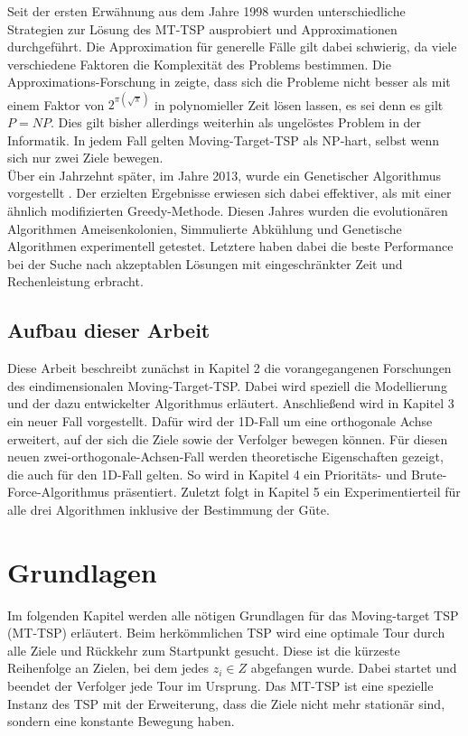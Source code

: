 \documentclass[german,version-2019-11]{uzl-thesis}
\begin{document}
Seit der ersten Erwähnung aus dem Jahre 1998 wurden unterschiedliche Strategien zur Lösung des MT-TSP ausprobiert und Approximationen durchgeführt. Die Approximation für generelle Fälle gilt dabei schwierig, da viele verschiedene Faktoren die Komplexität des Problems bestimmen. Die Approximations-Forschung in \cite{hammar} zeigte, dass sich die Probleme nicht besser als mit einem Faktor von $2^{\pi(\sqrt{\pi})}$ in polynomieller Zeit lösen lassen, es sei denn es gilt $P=NP$. Dies gilt bisher allerdings weiterhin als ungelöstes Problem in der Informatik. In jedem Fall gelten Moving-Target-TSP als NP-hart, selbst wenn sich nur zwei Ziele bewegen\cite{hammar}.\\
Über ein Jahrzehnt später, im Jahre 2013, wurde ein Genetischer Algorithmus vorgestellt
\cite{choubey2013moving}. Der erzielten Ergebnisse erwiesen sich dabei effektiver, als mit einer ähnlich modifizierten Greedy-Methode. Diesen Jahres wurden die evolutionären Algorithmen\cite{weicker2015evolutionare} Ameisenkolonien, Simmulierte Abkühlung und Genetische Algorithmen experimentell getestet\cite{moraes}. Letztere haben dabei die beste Performance bei der Suche nach akzeptablen Lösungen mit eingeschränkter Zeit und Rechenleistung erbracht.

\section{Aufbau dieser Arbeit}
Diese Arbeit beschreibt zunächst in Kapitel 2 die vorangegangenen Forschungen des eindimensionalen Moving-Target-TSP. Dabei wird speziell die Modellierung und der dazu entwickelter Algorithmus erläutert. Anschließend wird in Kapitel 3 ein neuer Fall vorgestellt. Dafür wird der 1D-Fall um eine orthogonale Achse erweitert, auf der sich die Ziele sowie der Verfolger bewegen können. Für diesen neuen zwei-orthogonale-Achsen-Fall werden theoretische Eigenschaften gezeigt, die auch für den 1D-Fall gelten. So wird in Kapitel 4 ein Prioritäts- und Brute-Force-Algorithmus präsentiert. Zuletzt folgt in Kapitel 5 ein Experimentierteil für alle drei Algorithmen inklusive der Bestimmung der Güte.


\chapter{Grundlagen}
\label{chapter-use}
Im folgenden Kapitel werden alle nötigen Grundlagen für das Moving-target TSP (MT-TSP) erläutert. Beim herkömmlichen TSP wird eine optimale Tour durch alle Ziele und Rückkehr zum Startpunkt gesucht. Diese ist die kürzeste Reihenfolge an Zielen, bei dem jedes $z_i\in Z$ abgefangen wurde. Dabei startet und beendet der Verfolger jede Tour im Ursprung. Das MT-TSP ist eine spezielle Instanz des TSP mit der Erweiterung, dass die Ziele nicht mehr stationär sind, sondern eine konstante Bewegung haben.
\end{document}
